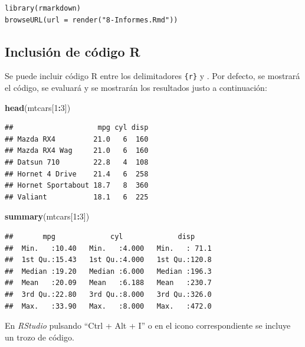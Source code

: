 \documentclass[]{book}
\newenvironment{Shaded}{\begin{snugshade}}{\end{snugshade}}
\newcommand{\DecValTok}[1]{\textcolor[rgb]{0.00,0.00,0.81}{#1}}
\newcommand{\KeywordTok}[1]{\textcolor[rgb]{0.13,0.29,0.53}{\textbf{#1}}}
\newcommand{\NormalTok}[1]{#1}
\newcommand{\OperatorTok}[1]{\textcolor[rgb]{0.81,0.36,0.00}{\textbf{#1}}}
\begin{document}
\begin{verbatim}
library(rmarkdown)
browseURL(url = render("8-Informes.Rmd"))
\end{verbatim}

\hypertarget{inclusion-de-codigo-r}{%
\subsection{Inclusión de código R}\label{inclusion-de-codigo-r}}

Se puede incluir código R entre los delimitadores \texttt{\textasciigrave{}\textasciigrave{}\textasciigrave{}\{r\}} y \texttt{\textasciigrave{}\textasciigrave{}\textasciigrave{}}. Por defecto, se mostrará el código, se evaluará y se mostrarán los resultados justo a continuación:

\begin{Shaded}
\begin{Highlighting}[]
\KeywordTok{head}\NormalTok{(mtcars[}\DecValTok{1}\OperatorTok{:}\DecValTok{3}\NormalTok{])}
\end{Highlighting}
\end{Shaded}

\begin{verbatim}
##                    mpg cyl disp
## Mazda RX4         21.0   6  160
## Mazda RX4 Wag     21.0   6  160
## Datsun 710        22.8   4  108
## Hornet 4 Drive    21.4   6  258
## Hornet Sportabout 18.7   8  360
## Valiant           18.1   6  225
\end{verbatim}

\begin{Shaded}
\begin{Highlighting}[]
\KeywordTok{summary}\NormalTok{(mtcars[}\DecValTok{1}\OperatorTok{:}\DecValTok{3}\NormalTok{])}
\end{Highlighting}
\end{Shaded}

\begin{verbatim}
##       mpg             cyl             disp      
##  Min.   :10.40   Min.   :4.000   Min.   : 71.1  
##  1st Qu.:15.43   1st Qu.:4.000   1st Qu.:120.8  
##  Median :19.20   Median :6.000   Median :196.3  
##  Mean   :20.09   Mean   :6.188   Mean   :230.7  
##  3rd Qu.:22.80   3rd Qu.:8.000   3rd Qu.:326.0  
##  Max.   :33.90   Max.   :8.000   Max.   :472.0
\end{verbatim}

En \emph{RStudio} pulsando ``Ctrl + Alt + I'' o en el icono correspondiente se incluye un trozo de código.
\end{document}
